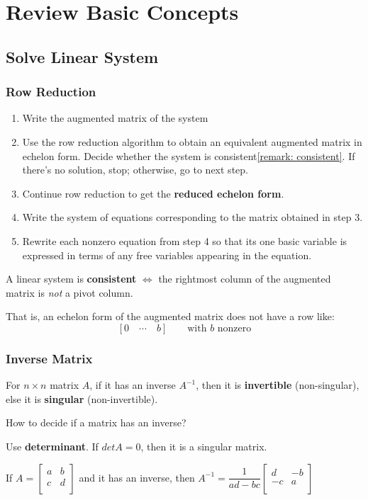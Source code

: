 \chapter{Review Basic Concepts}

\section{Solve Linear System}
\subsection{Row Reduction}
\begin{enumerate}
    \item Write the augmented matrix of the system
    \item Use the row reduction algorithm to obtain an equivalent augmented matrix in echelon form. 
    Decide whether the system is consistent\ref{remark: consistent}.
    If there's no solution, stop; otherwise, go to next step. 
    \item Continue row reduction to get the \textbf{reduced echelon form}.
    \item Write the system of equations corresponding to the matrix obtained in step 3.
    \item Rewrite each nonzero equation from step 4 so that its one basic variable is expressed in terms of any free variables appearing in the equation.
\end{enumerate}

\begin{remark}\label{remark: consistent}
    A linear system is \textbf{consistent} \(\iff\) 
    the rightmost column of the augmented matrix is \textit{not}  a pivot column.

    That is, an echelon form of the augmented matrix does not have a row like:
    \[
        [0 \quad \cdots \quad b] \qquad \text{with \(b\) nonzero}
    \]
\end{remark}


\subsection{Inverse Matrix}
For \(n \times n\) matrix \(A\), if it has an inverse \(A^{-1}\), then it is \textbf{invertible} (non-singular), 
else it is \textbf{singular} (non-invertible).

\begin{note}
    How to decide if a matrix has an inverse?

    Use \textbf{determinant}. 
    If \(det A = 0\), then it is a singular matrix.  

    If \(A = \begin{bmatrix}
        a &  b \\
        c &  d \\
    \end{bmatrix}\) and it has an inverse, then \(A^{-1} = \dfrac{1}{ad - bc} \begin{bmatrix}
        d & -b  \\
        -c & a  \\
    \end{bmatrix} \) 
\end{note}

